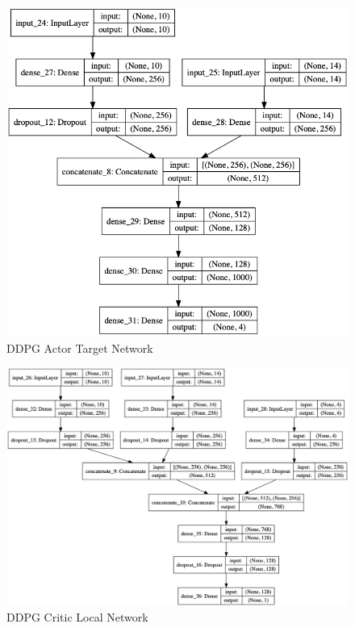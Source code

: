 \documentclass[doc, onecolumn, 12pt]{apa6}
\begin{document}
\begin{figure}
\label{DDPG_ActorTarget}
\includegraphics[width=\textwidth]{results/ddpg/DDPG_Actortg.png}
\caption{DDPG Actor Target Network}
\end{figure}

\begin{figure}
\label{DDPG_CriticLocal}
\includegraphics[width=\textwidth]{results/ddpg/DDPG_critictlc.png}
\caption{DDPG Critic Local Network}
\end{figure}
\end{document}
